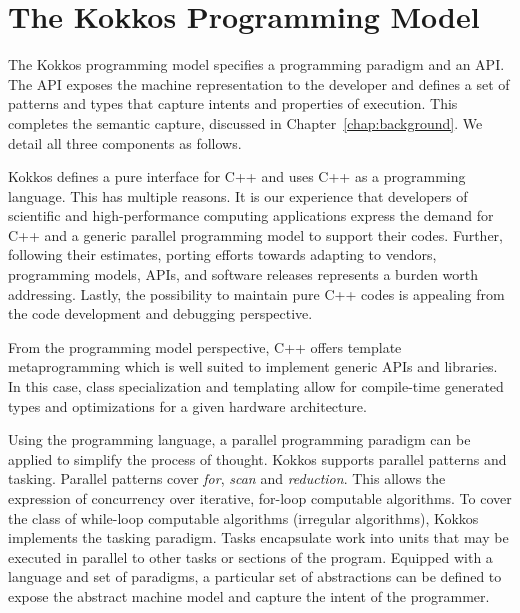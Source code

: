 \section{The Kokkos Programming Model}\label{chap:kokkosPM}

The Kokkos programming model specifies a programming paradigm and an API. The API exposes the machine representation to the developer and defines a set of patterns and types that capture intents and properties of execution. This completes the semantic capture, discussed in Chapter~\ref{chap:background}. We detail all three components as follows.

Kokkos defines a pure interface for C++ and uses C++ as a programming language. This has multiple reasons. It is our experience that developers of scientific and high-performance computing applications express the demand for C++ and a generic parallel programming model to support their codes. Further, following their estimates, porting efforts towards adapting to vendors, programming models, APIs, and software releases represents a burden worth addressing. Lastly, the possibility to maintain pure C++ codes is appealing from the code development and debugging perspective. 

From the programming model perspective, C++ offers template metaprogramming which is well suited to implement generic APIs and libraries. In this case, class specialization and templating allow for compile-time generated types and optimizations for a given hardware architecture. 

Using the programming language, a parallel programming paradigm can be applied to simplify the process of thought. Kokkos supports parallel patterns and tasking. Parallel patterns cover \emph{for}, \emph{scan} and \emph{reduction}. This allows the expression of concurrency over iterative, for-loop computable algorithms. To cover the class of while-loop computable algorithms (irregular algorithms), Kokkos implements the tasking paradigm. Tasks encapsulate work into units that may be executed in parallel to other tasks or sections of the program. Equipped with a language and set of paradigms, a particular set of abstractions can be defined to expose the abstract machine model and capture the intent of the programmer.

